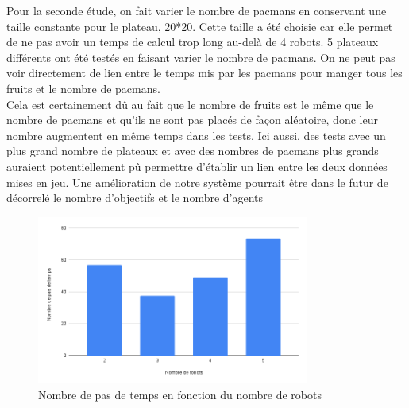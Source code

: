 Pour la seconde étude, on fait varier le nombre de \glspl{pacman} en conservant une taille constante pour le plateau, 20*20. Cette taille a été choisie car elle permet de ne pas avoir un temps de calcul trop long au-delà de 4 robots. 5 plateaux différents ont été testés en faisant varier le nombre de \glspl{pacman}. On ne peut pas voir directement de lien entre le temps mis par les \glspl{pacman} pour manger tous les \glspl{fruit} et le nombre de \glspl{pacman}.\\
Cela est certainement dû au fait que le nombre de \glspl{fruit} est le même que le nombre de \glspl{pacman} et qu'ils ne sont pas placés de façon aléatoire, donc leur nombre augmentent en même temps dans les tests. Ici aussi, des tests avec un plus grand nombre de plateaux et avec des nombres de \glspl{pacman} plus grands auraient potentiellement pû permettre d’établir un lien entre les deux données mises en jeu. Une amélioration de notre système pourrait être dans le futur de décorrelé le nombre d'objectifs et le nombre d'agents
\begin{figure}[H]
	\centering
	\includegraphics[width=0.8\textwidth]{image/resultat2}
	\caption{Nombre de pas de temps en fonction du nombre de robots}
\end{figure}
